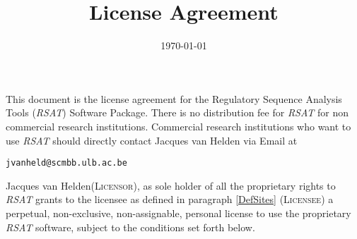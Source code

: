 \documentclass[12pt]{article}
\title{\RSAT License Agreement}
\author{\vspace*{-1cm}}
\date{\vspace*{-1cm}\today}
\makeatletter
\newcommand{\RSAT}[0]{\emph{RSAT}\xspace}
\newcommand{\Licensorname}[0]{Jacques van Helden\xspace}
\newcommand{\Licensor}[0]{\textsc{Licensor}\xspace}
\newcommand{\Licensee}[0]{\textsc{Licensee}\xspace}
\newcommand{\JvHemail}[0]{\texttt{\small jvanheld@scmbb.ulb.ac.be}\xspace}
\makeatother
\begin{document}
\maketitle

This document is the license agreement for the Regulatory Sequence
Analysis Tools (\RSAT) Software Package.  There is no distribution fee
for \RSAT for non commercial research institutions. Commercial
research institutions who want to use \RSAT should directly contact
Jacques van Helden via Email at
\begin{center}
\JvHemail
\end{center}

\Licensorname (\Licensor), as sole holder of all the proprietary
rights to \RSAT grants to the licensee as defined in paragraph
\ref{DefSites} (\Licensee) a perpetual, non-exclusive, non-assignable,
personal license to use the proprietary \RSAT software, subject to the
conditions set forth below.
\end{document}
